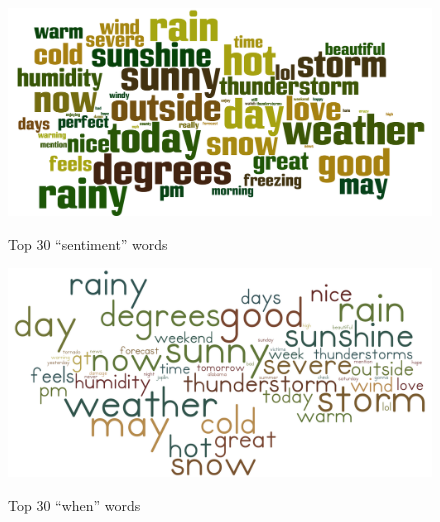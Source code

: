 \begin{figure}[!htb]
  \includegraphics[width=\linewidth]{wordclouds/31sentiment}
  \caption{Top 30 ``sentiment'' words}\label{fig:awesome_image1}
\endminipage\hfill
{}
  \includegraphics[width=\linewidth]{wordclouds/31when}
  \caption{Top 30 ``when'' words}\label{fig:awesome_image2}
\endminipage\hfill
\noindent{}
\end{figure}


